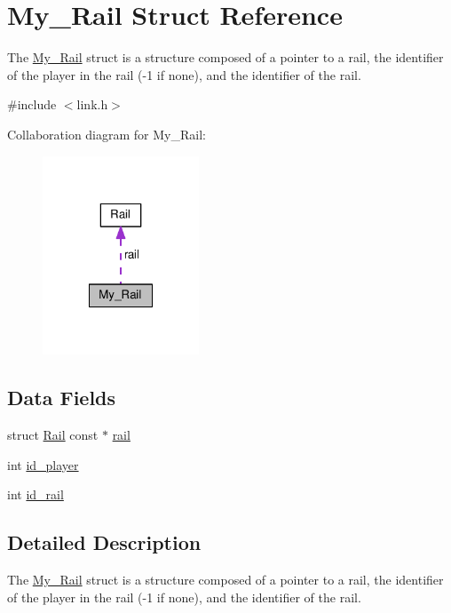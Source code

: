 \hypertarget{structMy__Rail}{\section{My\-\_\-\-Rail Struct Reference}
\label{structMy__Rail}
}


The \hyperlink{structMy__Rail}{My\-\_\-\-Rail} struct is a structure composed of a pointer to a rail, the identifier of the player in the rail (-\/1 if none), and the identifier of the rail.  




{\ttfamily \#include $<$link.\-h$>$}



Collaboration diagram for My\-\_\-\-Rail\-:
\nopagebreak
\begin{figure}[H]
\begin{center}
\leavevmode
\includegraphics[width=132pt]{structMy__Rail__coll__graph}
\end{center}
\end{figure}
\subsection*{Data Fields}
\begin{DoxyCompactItemize}
\item 
struct \hyperlink{structRail}{Rail} const $\ast$ \hyperlink{structMy__Rail_ac3b4b1be4ff56fa71c889afa8c8c7888}{rail}
\item 
int \hyperlink{structMy__Rail_a7a793a40560fbe6a7df025a117e93272}{id\-\_\-player}
\item 
int \hyperlink{structMy__Rail_a79d06d37269735dfc8b180a8be0fe759}{id\-\_\-rail}
\end{DoxyCompactItemize}


\subsection{Detailed Description}
The \hyperlink{structMy__Rail}{My\-\_\-\-Rail} struct is a structure composed of a pointer to a rail, the identifier of the player in the rail (-\/1 if none), and the identifier of the rail. 

